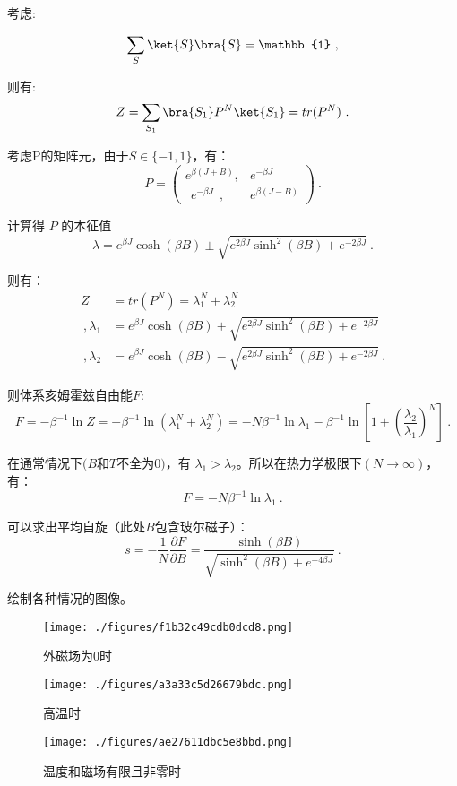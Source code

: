 考虑:

\begin{equation}
\sum_S\ket{S}\bra{S}=\mathbb{1}~,
\end{equation}

则有:
\begin{equation}
Z=\sum\limits_{S_1}\bra{S_1}P^N\ket{S_1}=tr(P^N)~.
\end{equation}

考虑P的矩阵元，由于$S\in\{-1,1\}$，有：
$$P=\begin{pmatrix}
e^{\beta(J+B)},&e^{-\beta J} \\
~~e^{-\beta J}~~, & e^{\beta(J-B)}
\end{pmatrix}~.$$

计算得 $P$ 的本征值
$$\lambda=e^{\beta J}\cosh{(\beta B)}\pm \sqrt{e^{2\beta J }\sinh^2{(\beta B)}+e^{-2\beta J }}~.$$

则有：
\begin{align}
Z&=tr(P^N)=\lambda_1^N+\lambda_2^N \\~,
\lambda_1&=e^{\beta J}\cosh{(\beta B)}+ \sqrt{e^{2\beta J }\sinh^2{(\beta B)}+e^{-2\beta J }} \\~,
\lambda_2&=e^{\beta J}\cosh{(\beta B)}- \sqrt{e^{2\beta J }\sinh^2{(\beta B)}+e^{-2\beta J }}~.
\end{align}

则体系亥姆霍兹自由能$F$:
$$F=-\beta^{-1}\ln{Z}=-\beta^{-1}\ln{(\lambda_1^N+\lambda_2^N)}=-N\beta^{-1}\ln{\lambda_1}-\beta^{-1}\ln[1+(\frac{\lambda_2}{\lambda_1})^N]~.$$

在通常情况下$(B$和$T$不全为$0)$，有 $\lambda_1>\lambda_2$。所以在热力学极限下$(N\rightarrow\infty)$，有：
$$F=-N\beta^{-1}\ln{\lambda_1}~.$$

可以求出平均自旋（此处$B$包含玻尔磁子）：
$$s=-\frac{1}{N}\frac{\partial F}{\partial B}=\frac{\sinh(\beta B)}{\sqrt{\sinh^2(\beta B)+e^{-4\beta J}}}~.$$

绘制各种情况的图像。

\begin{figure}[ht]
\centering
\texttt{[image: ./figures/f1b32c49cdb0dcd8.png]}
\caption{外磁场为0时} \label{fig_Ising_1}
\end{figure}

\begin{figure}[ht]
\centering
\texttt{[image: ./figures/a3a33c5d26679bdc.png]}
\caption{高温时} \label{fig_Ising_2}
\end{figure}

\begin{figure}[ht]
\centering
\texttt{[image: ./figures/ae27611dbc5e8bbd.png]}
\caption{温度和磁场有限且非零时} \label{fig_Ising_3}
\end{figure}


